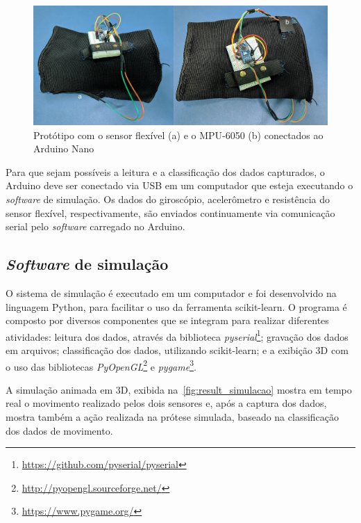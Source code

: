 \begin{figure}[ht]
	\caption{\label{fig:result_prototipo}Protótipo com o sensor flexível (a) e o MPU-6050 (b) conectados ao Arduino Nano}
	\begin{center}
	    \includegraphics[width=.8\textwidth]{resources/result_prototipo}
	\end{center}
\end{figure}

Para que sejam possíveis a leitura e a classificação dos dados capturados, o Arduino deve ser conectado via USB em um computador que esteja executando o \textit{software} de simulação. Os dados do giroscópio, acelerômetro e resistência do sensor flexível, respectivamente, são enviados continuamente via comunicação serial pelo \textit{software} carregado no Arduino.

\subsection{\textit{Software} de simulação}\label{sec:result_simulacao}
O sistema de simulação é executado em um computador e foi desenvolvido na linguagem Python, para facilitar o uso da ferramenta scikit-learn. O programa é composto por diversos componentes que se integram para realizar diferentes atividades: leitura dos dados, através da biblioteca \textit{pyserial}\footnote{\url{https://github.com/pyserial/pyserial}}; gravação dos dados em arquivos; classificação dos dados, utilizando scikit-learn; e a exibição 3D com o uso das bibliotecas \textit{PyOpenGL}\footnote{\url{http://pyopengl.sourceforge.net/}} e \textit{pygame}\footnote{\url{https://www.pygame.org/}}.

A simulação animada em 3D, exibida na~\autoref{fig:result_simulacao} mostra em tempo real o movimento realizado pelos dois sensores e, após a captura dos dados, mostra também a ação realizada na prótese simulada, baseado na classificação dos dados de movimento.


